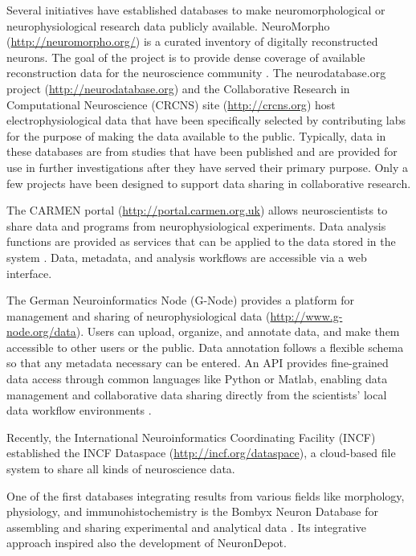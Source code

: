 \documentclass{frontiersSCNS} %
\begin{document}
Several initiatives have established databases to make neuromorphological or
neurophysiological research data publicly available. NeuroMorpho
(\url{http://neuromorpho.org/}) is a curated inventory of digitally
reconstructed neurons. The goal of the project is to provide dense coverage of
available reconstruction data for the neuroscience community
\citep{Ascoli2007}. The neurodatabase.org project
(\url{http://neurodatabase.org}) and the Collaborative Research in
Computational Neuroscience (CRCNS) site (\url{http://crcns.org}) host
electrophysiological data that have been specifically selected by contributing
labs for the purpose of making the data available to the public.  Typically,
data in these databases are from studies that have been published and are
provided for use in further investigations after they have served their primary
purpose. Only a few projects have been designed to support data sharing in
collaborative research.

The CARMEN portal (\url{http://portal.carmen.org.uk}) allows neuroscientists to
share data and programs from neurophysiological experiments. Data analysis
functions are provided as services that can be applied to the data stored in
the system \citep{austin_carmen:_2011}. Data, metadata, and analysis workflows
are accessible via a web interface.

The German Neuroinformatics Node (G-Node) provides a platform for management
and sharing of neurophysiological data (\url{http://www.g-node.org/data}).
Users can upload, organize, and annotate data, and make them accessible to
other users or the public. Data annotation follows a flexible schema
\citep{Grewe2011} so that any metadata necessary can be entered. An API
provides fine-grained data access through common languages like Python or
Matlab, enabling data management and collaborative data sharing directly from
the scientists' local data workflow environments
\citep{Sobolev_data_2014,Sobolev_integrated_2014}.

Recently, the International Neuroinformatics Coordinating Facility (INCF)
established the INCF Dataspace (\url{http://incf.org/dataspace}), a cloud-based
file system to share all kinds of neuroscience data.

One of the first databases integrating results from various fields like
morphology, physiology, and immunohistochemistry is the Bombyx Neuron Database
for assembling and sharing experimental and analytical data \citep{Kazawa2008}.
Its integrative approach inspired also the development of NeuronDepot.
\end{document}
